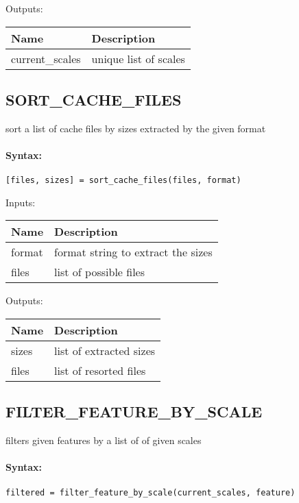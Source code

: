 \bigskip
Outputs:

\begin{tabular}{|p{}|p{}|}
\hline
\textbf{Name} & \textbf{Description} \\
\hline \hline
current\_scales & unique list of scales  \\ \hline
\end{tabular}

\subsection{SORT\_CACHE\_FILES}

sort a list of cache files by sizes extracted by the given format

\paragraph{Syntax:} \verb|[files, sizes] = sort_cache_files(files, format)|

\bigskip
Inputs:

\begin{tabular}{|p{}|p{}|}
\hline
\textbf{Name} & \textbf{Description} \\
\hline \hline
format & format string to extract the sizes  \\ \hline
files & list of possible files  \\ \hline
\end{tabular}

\bigskip
Outputs:

\begin{tabular}{|p{}|p{}|}
\hline
\textbf{Name} & \textbf{Description} \\
\hline \hline
sizes & list of extracted sizes  \\ \hline
files & list of resorted files  \\ \hline
\end{tabular}

\subsection{FILTER\_FEATURE\_BY\_SCALE}

filters given features by a list of of given scales

\paragraph{Syntax:} \verb|filtered = filter_feature_by_scale(current_scales, feature)|

